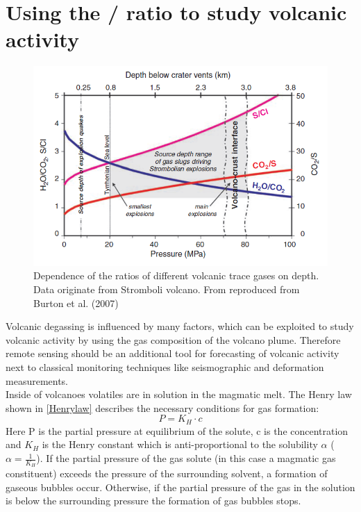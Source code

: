 \documentclass  [
  paper    = a4,
  BCOR     = 10mm,
  twoside,
  fontsize = 12pt,
  fleqn,
  toc      = bibnumbered,
  toc      = listofnumbered,
  numbers  = noendperiod,
  headings = normal,
  listof   = leveldown,
  version  = 3.03
]                                       {scrreprt}
\begin{document}
\section{Using the /  ratio to study volcanic activity}
\begin{figure}
	\centering
	\includegraphics[width=0.9\linewidth]{Zwischenbericht2018/Bilder/so2_bro}
	\caption{Dependence of the ratios of different volcanic trace gases on depth. Data originate from Stromboli volcano. From \citet{lubcke2014optical} reproduced from Burton et al. (2007)}
	\label{fig:so2bro}
\end{figure}    
Volcanic degassing is influenced by many factors, which can be exploited to study volcanic activity by using the gas composition of the volcano plume. Therefore remote sensing should be an additional tool for forecasting of volcanic activity next to classical monitoring techniques like seismographic and deformation measurements.\\
Inside of volcanoes volatiles are in solution in the magmatic melt. The Henry law shown in \cref{Henrylaw} describes the necessary conditions for gas formation:
\begin{equation}
P = K_{H}\cdot c
\label{Henrylaw}
\end{equation}
Here P is the partial pressure at equilibrium of the solute, c is the concentration and $ K_{H}$ is the Henry constant which is anti-proportional to the solubility $\alpha$ ($\alpha = \frac{1}{ K_{H}}$).
If the partial pressure of the gas solute (in this case a magmatic gas constituent) exceeds the pressure of the surrounding solvent, a formation of gaseous bubbles occur. Otherwise, if the partial pressure of the gas in the solution is below the surrounding pressure the formation of gas bubbles stops.\\
\end{document}
